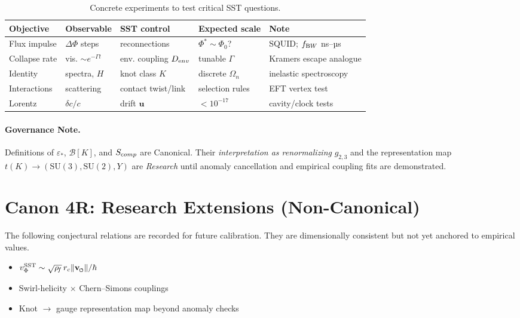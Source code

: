 \documentclass[11pt]{article}
\newcommand{\swirlarrow}{%
     \mathchoice{\mkern-2mu\scriptstyle\boldsymbol{\circlearrowleft}}%
                {\mkern-2mu\scriptstyle\boldsymbol{\circlearrowleft}}%
                {\mkern-2mu\scriptscriptstyle\boldsymbol{\circlearrowleft}}%
                {\mkern-2mu\scriptscriptstyle\boldsymbol{\circlearrowleft}}%
}
\newcommand{\vswirl}{\mathbf{v}_{\swirlarrow}}
\begin{document}
\begin{table}[H]
\centering
\caption{Concrete experiments to test critical SST questions.}
\begin{tabular}{lllll}
\toprule
Objective & Observable & SST control & Expected scale & Note \\
\midrule
Flux impulse & $\Delta\Phi$ steps & reconnections & $\Phi^*\sim\Phi_0$? & SQUID; $f_{\textrm BW}$ ns--µs \\
Collapse rate & vis. $\sim e^{-\Gamma t}$ & env. coupling $D_{\textrm env}$ & tunable $\Gamma$ & Kramers escape analogue \\
Identity & spectra, $H$ & knot class $K$ & discrete $\Omega_n$ & inelastic spectroscopy \\
Interactions & scattering & contact twist/link & selection rules & EFT vertex test \\
Lorentz & $\delta c/c$ & drift $\mathbf u$ & $<10^{-17}$ & cavity/clock tests \\
\bottomrule
\end{tabular}
\end{table}

\paragraph{Governance Note.}
Definitions of $\varepsilon_*$, $\mathcal B[K]$, and $S_{\textrm comp}$ are Canonical.
Their \emph{interpretation as renormalizing} $g_{2,3}$ and the representation map
$t(K)\to(\mathrm{SU}(3),\mathrm{SU}(2),Y)$ are \emph{Research} until anomaly cancellation
and empirical coupling fits are demonstrated.

\section*{Canon 4R: Research Extensions (Non-Canonical)}
The following conjectural relations are recorded for future calibration. They are
dimensionally consistent but not yet anchored to empirical values.
\begin{itemize}
	\item $v_\Phi^{\rm SST} \sim \sqrt{\rho_{\!f}}\, r_c \lVert \vswirl \rVert / \hbar$
	\item Swirl-helicity $\times$ Chern–Simons couplings
	\item Knot $\to$ gauge representation map beyond anomaly checks
\end{itemize}

\end{document}
